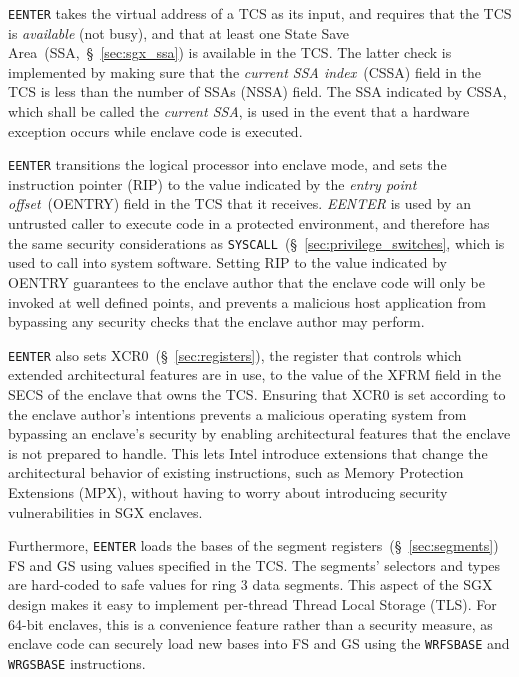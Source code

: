
\texttt{EENTER} takes the virtual address of a TCS as its input, and requires
that the TCS is \textit{available} (not busy), and that at least one State Save
Area~(SSA,~\S~\ref{sec:sgx_ssa}) is available in the TCS. The latter check is
implemented by making sure that the \textit{current SSA index}~(CSSA) field in
the TCS is less than the number of SSAs (NSSA) field. The SSA indicated by
CSSA, which shall be called the \textit{current SSA}, is used in the event that
a hardware exception occurs while enclave code is executed.

\texttt{EENTER} transitions the logical processor into enclave mode, and sets
the instruction pointer (RIP) to the value indicated by the \textit{entry point
offset}~(OENTRY) field in the TCS that it receives. \textit{EENTER} is used by
an untrusted caller to execute code in a protected environment, and therefore
has the same security considerations as
\texttt{SYSCALL}~(\S~\ref{sec:privilege_switches}, which is used to call into
system software. Setting RIP to the value indicated by OENTRY guarantees to the
enclave author that the enclave code will only be invoked at well defined
points, and prevents a malicious host application from bypassing any security
checks that the enclave author may perform.


\texttt{EENTER} also sets XCR0~(\S~\ref{sec:registers}), the register that
controls which extended architectural features are in use, to the value of the
XFRM field in the SECS of the enclave that owns the TCS. Ensuring that XCR0 is
set according to the enclave author's intentions prevents a malicious operating
system from bypassing an enclave's security by enabling architectural features
that the enclave is not prepared to handle. This lets Intel introduce
extensions that change the architectural behavior of existing instructions,
such as Memory Protection Extensions (MPX), without having to worry about
introducing security vulnerabilities in SGX enclaves.

Furthermore, \texttt{EENTER} loads the bases of the segment
registers~(\S~\ref{sec:segments}) FS and GS using values specified in the TCS.
The segments' selectors and types are hard-coded to safe values for ring 3 data
segments. This aspect of the SGX design makes it easy to implement per-thread
Thread Local Storage (TLS). For 64-bit enclaves, this is a convenience feature
rather than a security measure, as enclave code can securely load new bases
into FS and GS using the \texttt{WRFSBASE} and \texttt{WRGSBASE} instructions.

